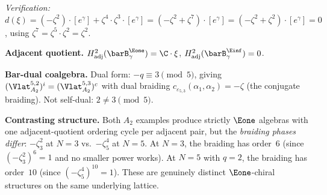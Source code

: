 \begin{computation}[\texorpdfstring{$A_2$}{A_2} with non-standard parameter: \texorpdfstring{$N = 5$}{N = 5}, \texorpdfstring{$q = 2$}{q = 2}]
\emph{Verification:}
$d(\xi)
= (-\zeta^2) \cdot [e^\gamma] + \zeta^4 \cdot \zeta^3 \cdot [e^\gamma]
= (-\zeta^2 + \zeta^7) \cdot [e^\gamma]
= (-\zeta^2 + \zeta^2) \cdot [e^\gamma] = 0$,
using $\zeta^7 = \zeta^5 \cdot \zeta^2 = \zeta^2$.

\noindent\textbf{Adjacent quotient.}
$H^2_{\mathrm{adj}}(\barB^{\Eone}_\gamma) = \C \cdot \xi$,\;
$H^2_{\mathrm{adj}}(\barB^{\Einf}_\gamma) = 0$.
\smallskip

\noindent\textbf{Bar-dual coalgebra.}
Dual form: $-q \equiv 3 \pmod{5}$, giving
$(\Vlat_{A_2}^{5,2})^i = (\Vlat_{A_2}^{5,3})^c$ with
dual braiding $c_{\varepsilon_{5,3}}(\alpha_1,\alpha_2) = -\zeta$
(the conjugate braiding). Not self-dual: $2 \neq 3 \pmod{5}$.
\smallskip

\noindent\textbf{Contrasting structure.}
Both $A_2$ examples produce strictly $\Eone$ algebras with one
adjacent-quotient ordering cycle per adjacent pair, but the
\emph{braiding phases differ}:
$-\zeta_3^2$ at $N = 3$ vs.\ $-\zeta_5^4$ at $N = 5$.
At $N = 3$, the braiding has order~$6$ (since $(-\zeta_3^2)^6 = 1$
and no smaller power works).
At $N = 5$ with $q = 2$, the braiding has order~$10$
(since $(-\zeta_5^4)^{10} = 1$).
These are genuinely distinct $\Eone$-chiral structures on the
same underlying lattice.
\end{computation}



